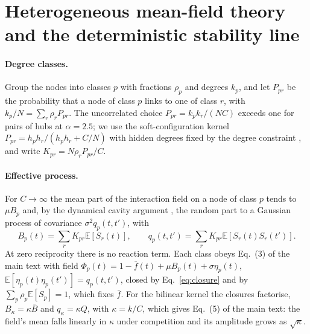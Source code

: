 \documentclass[pre,onecolumn,superscriptaddress,nofootinbib]{revtex4-2}
\newcommand{\E}{\mathbb E}
\begin{document}
\section{Heterogeneous mean-field theory and the deterministic stability line}
\label{sec:hdmft}

\paragraph{Degree classes.}  Group the nodes into classes $p$ with fractions $\rho_p$ and degrees
$k_p$, and let $P_{pr}$ be the probability that a node of class $p$ links to one of class $r$, with
$k_p/N=\sum_r\rho_rP_{pr}$.  The uncorrelated choice $P_{pr}=k_pk_r/(NC)$ exceeds one for pairs of hubs
at $\alpha=2.5$; we use the soft-configuration kernel $P_{pr}=h_ph_r/(h_ph_r+C/N)$ with hidden degrees fixed
by the degree constraint \cite{patil2026}, and write $K_{pr}=N\rho_rP_{pr}/C$.

\paragraph{Effective process.}  For $C\to\infty$ the mean part of the interaction field on a node of
class $p$ tends to $\mu B_p$ and, by the dynamical cavity argument
\cite{bunin2017,galla2018,aguirrelopez}, the random part to a Gaussian process of covariance
$\sigma^2q_p(t,t')$, with
\begin{equation}
B_p(t)=\sum_rK_{pr}\E[S_r(t)],\qquad q_p(t,t')=\sum_rK_{pr}\E[S_r(t)S_r(t')] .
\label{eq:closure}
\end{equation}
At zero reciprocity there is no reaction term.  Each class obeys Eq.~(3) of the main text with field
$\Phi_p(t)=1-\bar f(t)+\mu B_p(t)+\sigma\eta_p(t)$, $\E[\eta_p(t)\eta_p(t')]=q_p(t,t')$, closed by
Eq.~\eqref{eq:closure} and by $\sum_p\rho_p\E[S_p]=1$, which fixes $\bar f$.  For the bilinear kernel the
closures factorise, $B_\kappa=\kappa\bar B$ and $q_\kappa=\kappa Q$, with $\kappa=k/C$, which gives Eq.~(5) of the
main text: the field's mean falls linearly in $\kappa$ under competition and its amplitude grows as
$\sqrt\kappa$.
\end{document}
